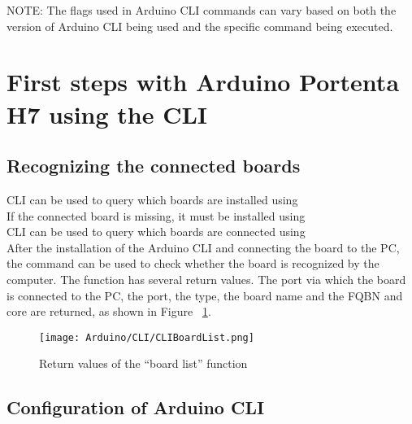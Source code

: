 NOTE: The flags used in Arduino CLI commands can vary based on both the version of Arduino CLI being used and the specific command being executed.

\section{First steps with Arduino Portenta H7 using the CLI}

\subsection{Recognizing the connected boards}

CLI can be used to query which boards are installed using 
\\
If the connected board is missing, it must be installed using 
\\
CLI can be used to query which boards are connected using 
\\
After the installation of the Arduino CLI and connecting the board to the PC, the command  can be used to check whether the board is recognized by the computer. The function  has several return values. The port via which the board is connected to the PC, the port, the type, the board name and the FQBN and core are returned, 
as shown in Figure ~\ref{CLIBoardList}. 
\begin{figure}
	\begin{center}
		\texttt{[image: Arduino/CLI/CLIBoardList.png]}
		\caption{ Return values of the “board list” function }
		\label{CLIBoardList}
	\end{center}
\end{figure}

\subsection{Configuration of Arduino CLI}

